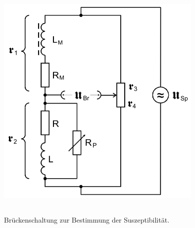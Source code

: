 \begin{figure}
    \centering
    \includegraphics[width=10cm, height=12cm]{build/brueckenschaltung.png}
    \caption{Brückenschaltung zur Bestimmung der Suszeptibilität. \cite{V606}}
    \label{abb:brueckenschaltung}
\end{figure}